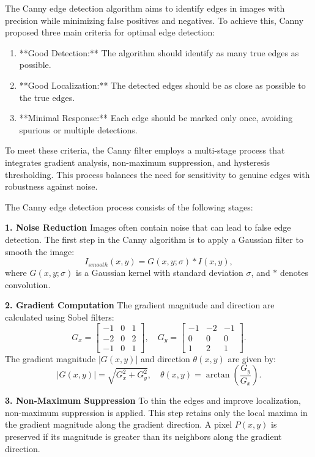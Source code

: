 \documentclass[11pt]{book}
\begin{document}
The Canny edge detection algorithm aims to identify edges in images with precision while minimizing false positives and negatives. To achieve this, Canny proposed three main criteria for optimal edge detection:
\begin{enumerate}
    \item **Good Detection:** The algorithm should identify as many true edges as possible.
    \item **Good Localization:** The detected edges should be as close as possible to the true edges.
    \item **Minimal Response:** Each edge should be marked only once, avoiding spurious or multiple detections.
\end{enumerate}

To meet these criteria, the Canny filter employs a multi-stage process that integrates gradient analysis, non-maximum suppression, and hysteresis thresholding. This process balances the need for sensitivity to genuine edges with robustness against noise.

The Canny edge detection process consists of the following stages:

{\bf 1. Noise Reduction}
Images often contain noise that can lead to false edge detection. The first step in the Canny algorithm is to apply a Gaussian filter to smooth the image:
\[
I_{smooth}(x, y) = G(x, y; \sigma) * I(x, y),
\]
where $G(x, y; \sigma)$ is a Gaussian kernel with standard deviation $\sigma$, and $*$ denotes convolution.

{\bf 2. Gradient Computation}
The gradient magnitude and direction are calculated using Sobel filters:
\[
G_x = \begin{bmatrix}
-1 & 0 & 1 \\
-2 & 0 & 2 \\
-1 & 0 & 1
\end{bmatrix}, \quad
G_y = \begin{bmatrix}
-1 & -2 & -1 \\
 0 &  0 &  0 \\
 1 &  2 &  1
\end{bmatrix}.
\]
The gradient magnitude $|G(x, y)|$ and direction $\theta(x, y)$ are given by:
\[
|G(x, y)| = \sqrt{G_x^2 + G_y^2}, \quad \theta(x, y) = \arctan\left(\frac{G_y}{G_x}\right).
\]

{\bf 3. Non-Maximum Suppression}
To thin the edges and improve localization, non-maximum suppression is applied. This step retains only the local maxima in the gradient magnitude along the gradient direction. A pixel $P(x, y)$ is preserved if its magnitude is greater than its neighbors along the gradient direction.
\end{document}
